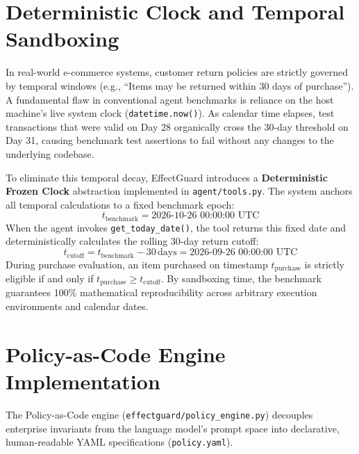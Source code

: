 \section{Deterministic Clock and Temporal Sandboxing}

In real-world e-commerce systems, customer return policies are strictly governed by temporal windows (e.g., ``Items may be returned within 30 days of purchase''). A fundamental flaw in conventional agent benchmarks is reliance on the host machine's live system clock (\texttt{datetime.now()}). As calendar time elapses, test transactions that were valid on Day 28 organically cross the 30-day threshold on Day 31, causing benchmark test assertions to fail without any changes to the underlying codebase.

To eliminate this temporal decay, EffectGuard introduces a \textbf{Deterministic Frozen Clock} abstraction implemented in \texttt{agent/tools.py}. The system anchors all temporal calculations to a fixed benchmark epoch:
\begin{equation}
    t_{\text{benchmark}} = \text{2026-10-26 00:00:00 UTC}
\end{equation}
When the agent invokes \texttt{get\_today\_date()}, the tool returns this fixed date and deterministically calculates the rolling 30-day return cutoff:
\begin{equation}
    t_{\text{cutoff}} = t_{\text{benchmark}} - 30\,\text{days} = \text{2026-09-26 00:00:00 UTC}
\end{equation}
During purchase evaluation, an item purchased on timestamp $t_{\text{purchase}}$ is strictly eligible if and only if $t_{\text{purchase}} \ge t_{\text{cutoff}}$. By sandboxing time, the benchmark guarantees 100\% mathematical reproducibility across arbitrary execution environments and calendar dates.

\section{Policy-as-Code Engine Implementation}

The Policy-as-Code engine (\texttt{effectguard/policy\_engine.py}) decouples enterprise invariants from the language model's prompt space into declarative, human-readable YAML specifications (\texttt{policy.yaml}).

